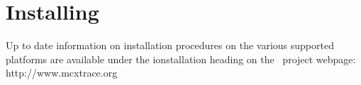\chapter{Installing \MCX}
\label{installing}
Up to date information on installation procedures on the various supported
platforms are available under the ionstallation heading on the \MCX\ project
webpage: http://www.mcxtrace.org

